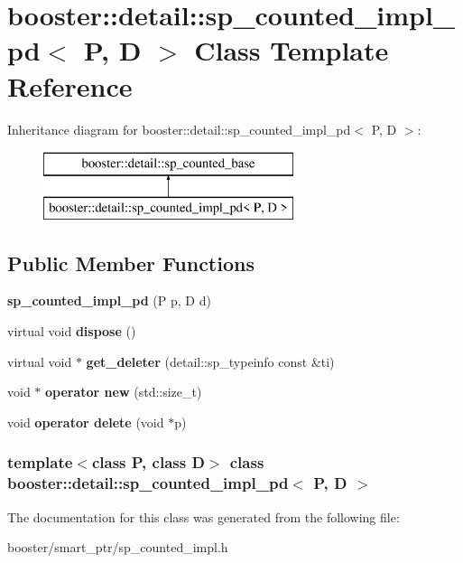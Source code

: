 \section{booster\-:\-:detail\-:\-:sp\-\_\-counted\-\_\-impl\-\_\-pd$<$ \-P, \-D $>$ \-Class \-Template \-Reference}
\label{classbooster_1_1detail_1_1sp__counted__impl__pd}
\-Inheritance diagram for booster\-:\-:detail\-:\-:sp\-\_\-counted\-\_\-impl\-\_\-pd$<$ \-P, \-D $>$\-:\begin{figure}[H]
\begin{center}
\leavevmode
\includegraphics[height=2.000000cm]{classbooster_1_1detail_1_1sp__counted__impl__pd}
\end{center}
\end{figure}
\subsection*{\-Public \-Member \-Functions}
\begin{DoxyCompactItemize}
\item 
{\bfseries sp\-\_\-counted\-\_\-impl\-\_\-pd} (\-P p, \-D d)\label{classbooster_1_1detail_1_1sp__counted__impl__pd_ad7133d9f3e1ecf5dc77b288a82e406fe}

\item 
virtual void {\bfseries dispose} ()\label{classbooster_1_1detail_1_1sp__counted__impl__pd_aa4eb83d2d7ec6e4bb44016af960ab45b}

\item 
virtual void $\ast$ {\bfseries get\-\_\-deleter} (detail\-::sp\-\_\-typeinfo const \&ti)\label{classbooster_1_1detail_1_1sp__counted__impl__pd_a471cb36a3e637c4c35e990ac59b8f199}

\item 
void $\ast$ {\bfseries operator new} (std\-::size\-\_\-t)\label{classbooster_1_1detail_1_1sp__counted__impl__pd_a6296ead5f1357c0271e642f3fd88be28}

\item 
void {\bfseries operator delete} (void $\ast$p)\label{classbooster_1_1detail_1_1sp__counted__impl__pd_a0d0fedc474695693a827d4da0380190c}

\end{DoxyCompactItemize}
\subsubsection*{template$<$class \-P, class \-D$>$ class booster\-::detail\-::sp\-\_\-counted\-\_\-impl\-\_\-pd$<$ P, D $>$}



\-The documentation for this class was generated from the following file\-:\begin{DoxyCompactItemize}
\item 
booster/smart\-\_\-ptr/sp\-\_\-counted\-\_\-impl.\-h\end{DoxyCompactItemize}
